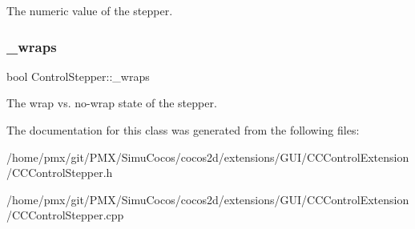 The numeric value of the stepper. \mbox{\label{classControlStepper_af7d9b1a82342df805f6d3bb90faa6ac1}} 
\subsubsection{\texorpdfstring{\+\_\+wraps}{\_wraps}}
{\footnotesize\ttfamily bool Control\+Stepper\+::\+\_\+wraps\hspace{0.3cm}{\ttfamily [protected]}}

The wrap vs. no-\/wrap state of the stepper. 

The documentation for this class was generated from the following files\+:\begin{DoxyCompactItemize}
\item 
/home/pmx/git/\+P\+M\+X/\+Simu\+Cocos/cocos2d/extensions/\+G\+U\+I/\+C\+C\+Control\+Extension/C\+C\+Control\+Stepper.\+h\item 
/home/pmx/git/\+P\+M\+X/\+Simu\+Cocos/cocos2d/extensions/\+G\+U\+I/\+C\+C\+Control\+Extension/C\+C\+Control\+Stepper.\+cpp\end{DoxyCompactItemize}
